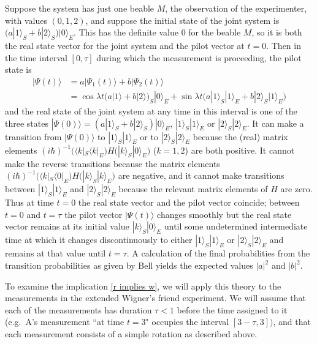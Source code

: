 \documentclass[12pt,a4paper,reqno]{article}
\renewcommand{\(}{\left(}
\renewcommand{\)}{\right)}
\renewcommand{\.}{\centerdot}
\newcommand{\1}{\mathbf{1}}
\newcommand{\<}{\langle}
\renewcommand{\>}{\rangle}
\theoremstyle{definition}
\theoremstyle{remark}
\numberwithin{equation}{section}
\begin{document}
Suppose the system has just one beable $M$, the observation of the experimenter, with values $(0,1,2)$, and suppose the initial state of the joint system is $\big(a|1\>_S + b|2\>_S\big)|0\>_E$. This has the definite value 0 for the beable $M$, so it is both the real state vector for the joint system and the pilot vector at $t = 0$. Then in the time interval $[0,\tau]$ during which the measurement is proceeding, the pilot state is 
\begin{align*}
|\Psi(t)\> &= a|\Psi_1(t)\> + b|\Psi_2(t)\>\\
&= \cos\lambda t\big(a|1\>+ b|2\>\big)_S|0\>_E + \sin\lambda t\big(a|1\>_S|1\>_E + b|2\>_S|1\>_E\big)
\end{align*}
and the real state of the joint system at any time in this interval is one of the three states $|\Psi(0)\> = (a|1\>_S + b|2\>_S)|0\>_E$, $|1\>_S|1\>_E$ or $|2\>_S|2\>_E$. It can make a transition from $|\Psi(0)\>$ to $|1\>_S|1\>_E$ or to $|2\>_S|2\>_E$ because the (real) matrix elements $(i\hbar)^{-1}\big(\<k|_S\<k|_E\big) H \big(|k\>_S|0\>_E\big)$ ($k = 1,2$) are both positive. It cannot make the reverse transitions because the  
matrix elements $(i\hbar)^{-1}\big(\<k|_S\<0|_E\big) H \big(|k\>_S|k\>_E\big)$ are negative, and it cannot make transitions between $|1\>_S|1\>_E$ and $|2\>_S|2\>_E$ because the relevant matrix elements of $H$ are zero. Thus at time $t = 0$ the real state vector and the pilot vector coincide; between $t = 0$ and $t = \tau$ the pilot vector $|\Psi(t)\>$ changes smoothly but the real state vector remains at its initial value $|k\>_S|0\>_E$ until some undetermined intermediate time at which it changes discontinuously to either $|1\>_S|1\>_E$ or $|2\>_S|2\>_E$ and remains at that value until $t = \tau$. A calculation of the final probabilities from the transition probabilities as given by Bell yields the expected values $|a|^2$ and $|b|^2$.  


To examine the implication \eqref{r implies w}, we will apply this theory to the measurements in the extended Wigner's friend experiment. We will assume that each of the measurements has duration $\tau < 1$ before the time assigned to it (e.g.\ A's measurement ``at time $t = 3$" occupies the interval $[3 - \tau, 3])$, and that each measurement consists of a simple rotation as described above.
\end{document}
